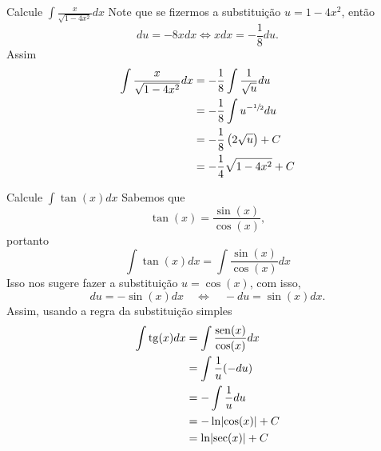 \begin{example}
  Calcule \(\int \frac{x}{\sqrt{1-4x^2}}dx\)
  \solution
  Note que se fizermos a substituição $u=1-4x^2$, então
  \[
    du = -8x dx \Leftrightarrow xdx = -\frac{1}{8} du.
  \]
  Assim
  \begin{align*}
    \int \frac{x}{\sqrt{1-4x^2}}dx
    & = -\frac{1}{8} \int \frac{1}{\sqrt{u}}du \\
    & = -\frac{1}{8} \int u^{-\sfrac{1}{2}} du \\
    & = -\frac{1}{8} \left(2 \sqrt{u}\right)+C \\
    & = -\frac{1}{4}\sqrt{1-4x^2}+C
  \end{align*}
\end{example}

\begin{example}
  Calcule \(\int \tan(x) dx\)
  \solution
  Sabemos que
  \[
    \tan(x)=\frac{\sin(x)}{\cos(x)},
  \]
  portanto
  \[
    \int \tan(x) dx= \int \frac{\sin(x)}{\cos(x)} dx
  \]
  Isso nos sugere fazer a substituição $u=\cos(x)$, com isso,
  \[
    du = -\sin(x)dx \quad\Leftrightarrow\quad
    -du = \sin(x)dx.
  \]
  Assim, usando a regra da substituição simples
  \begin{align*}
    \int \tan(x) dx
    & = \int \frac{\sin(x)}{\cos(x)} dx \\
    & = \int \frac{1}{u} (-du) \\
    & = - \int \frac{1}{u} du \\
    & = - \ln \abs{\cos(x)}+C \\
    & = \ln \abs{\sec(x)}+C
  \end{align*}
\end{example}

